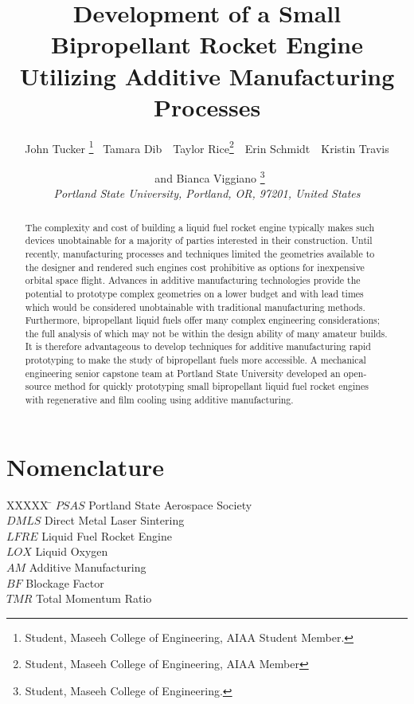 \documentclass[]{aiaa-tc}%
\title{Development of a Small Bipropellant Rocket Engine Utilizing Additive Manufacturing Processes}
\author{
  John Tucker%
    \thanks{Student, Maseeh College of Engineering, AIAA Student Member.}
    \ Tamara Dib\thanksibid{1}\
  \ Taylor Rice\thanks{Student, Maseeh College of Engineering, AIAA Member}\ 
  \ Erin Schmidt\thanksibid{1}\
  \ Kristin Travis\thanksibid{1}\\
  \and
  \ and Bianca Viggiano%
   \thanks{Student, Maseeh College of Engineering.}\\
  {\normalsize\itshape
 Portland State University, Portland, OR, 97201, United States}
 }
\begin{document}
\maketitle

\begin{abstract}
The complexity and cost of building a liquid fuel rocket engine typically makes such devices unobtainable for a majority of parties interested in their construction. Until recently, manufacturing processes and techniques limited the geometries available to the designer and rendered such engines cost prohibitive as options for inexpensive orbital space flight. Advances in additive manufacturing technologies provide the potential to prototype complex geometries on a lower budget and with lead times which would be considered unobtainable with traditional manufacturing methods. Furthermore, bipropellant liquid fuels offer many complex engineering considerations; the full analysis of which may not be within the design ability of many amateur builds. It is therefore advantageous to develop techniques for additive manufacturing rapid prototyping to make the study of bipropellant fuels more accessible. A mechanical engineering senior capstone team at Portland State University developed an open-source method for quickly prototyping small bipropellant liquid fuel rocket engines with regenerative and film cooling using additive manufacturing.
\end{abstract}





\section*{Nomenclature} %

\begin{tabbing}
  XXXXX \= \kill%
  $PSAS$ \> Portland State Aerospace Society\\
  $DMLS$ \> Direct Metal Laser Sintering\\
  $LFRE$ \> Liquid Fuel Rocket Engine\\
  $LOX$ \> Liquid Oxygen\\
  $AM$ \> Additive Manufacturing\\
  $BF$ \> Blockage Factor\\
  $TMR$ \> Total Momentum Ratio\\
  
 \end{tabbing}
\end{document}
